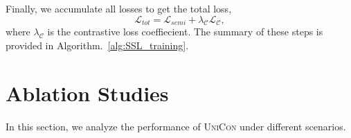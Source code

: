 \documentclass[10pt,twocolumn,letterpaper]{article}
\begin{document}
\begin{table*}[t]
\centering
{}
\caption{Hyperparameter Settings for \textsc{UniCon}. Most of the parameters are the same across different datasets. This shows the general applicability of the proposed \textsc{UniCon} method.}
\label{tab:hyperparameters}
\end{table*}



Finally, we accumulate all losses to get the total loss, 
\begin{equation}
    \mathcal{L}_{tot}=\mathcal{L}_{semi} + \lambda_\mathcal{C} \mathcal{L}_\mathcal{C},    
\end{equation}
where $\lambda_\mathcal{C}$ is the contrastive loss coeffiecient. The summary of these steps is provided in Algorithm.~\ref{alg:SSL_training}.

\section{Ablation Studies} \label{sec:ablation_studies}
In this section, we analyze the performance of \textsc{UniCon} under different scenarios.
\end{document}
